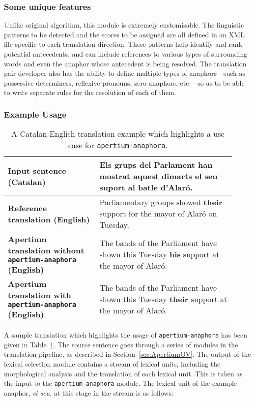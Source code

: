 \documentclass[free]{flammie}
\begin{document}
\subsubsection{Some unique features}\label{sec:ARUniqueFeatures}
Unlike \cite{mitkov1999multilingual} original algorithm, this module is
extremely customisable.  The linguistic patterns to be detected and the scores
to be assigned are all defined in an XML file specific to each translation
direction. These patterns help identify and rank potential antecedents, and can
include references to various types of surrounding words and even the anaphor
whose antecedent is being resolved.  The translation pair developer also has the
ability to define multiple types of anaphors---such as possessive determiners,
reflexive pronouns, zero anaphors, etc.---so as to be able to write separate
rules for the resolution of each of them.

\subsubsection{Example Usage}\label{sec:ARExampleUsage}

\begin{table}[ht]
\caption{A Catalan-English translation example which highlights a use case for \texttt{apertium-anaphora}.}
\label{tab:ARExample}
\begin{tabular}{p{0.37\linewidth}  p{0.55\linewidth}}
\toprule
\textbf{Input sentence (Catalan)}&Els grups del Parlament han mostrat aquest dimarts \textbf{el seu} suport al batle d'Alaró.\\
\midrule
\textbf{Reference translation (English)}&Parliamentary groups showed \textbf{their} support for the mayor of Alaró on Tuesday.\\
\midrule
\textbf{Apertium translation without \texttt{apertium-anaphora} (English)}&The bands of the Parliament have shown this Tuesday \textbf{his} support at the mayor of Alaró.\\
\midrule
\textbf{Apertium translation with \texttt{apertium-anaphora} (English)}&The bands of the Parliament have shown this Tuesday \textbf{their} support at the mayor of Alaró.\\

\bottomrule
\end{tabular}
\end{table}

A sample translation which highlights the usage of \texttt{apertium-anaphora}
has been given in Table~\ref{tab:ARExample}. The source sentence goes through a
series of modules in the translation pipeline, as described in
Section~\ref{sec:ApertiumOV}. The output of the lexical selection module
contains a stream of lexical units, including the morphological analysis and the
translation of each lexical unit. This is taken as the input to the
\texttt{apertium-anaphora} module. The lexical unit of the example anaphor,
\textit{el seu}, at this stage in the stream is as follows:
\end{document}
